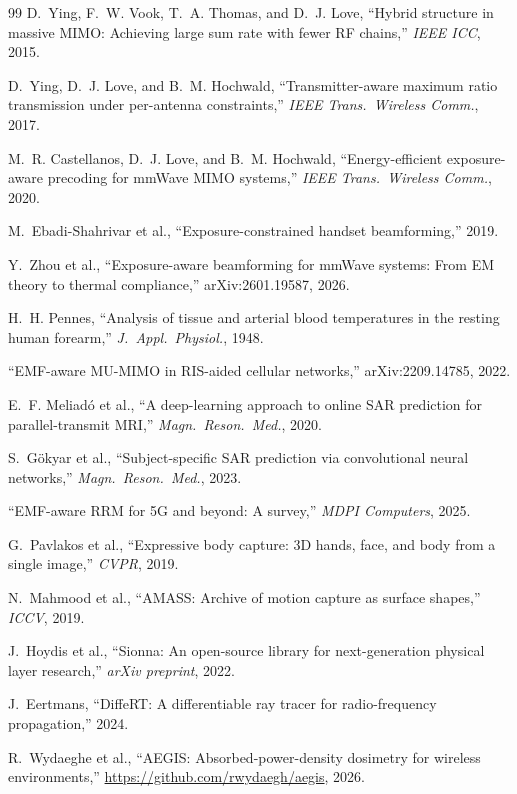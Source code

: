 \documentclass[journal,twoside,onecolumn]{IEEEtran}
\theoremstyle{definition}
\begin{document}
\begin{thebibliography}{99}
D.~Ying, F.~W. Vook, T.~A. Thomas, and D.~J. Love,
``Hybrid structure in massive MIMO: Achieving large sum rate with
fewer RF chains,'' \emph{IEEE ICC}, 2015.

D.~Ying, D.~J. Love, and B.~M. Hochwald, ``Transmitter-aware
maximum ratio transmission under per-antenna constraints,''
\emph{IEEE Trans.\ Wireless Comm.}, 2017.

M.~R. Castellanos, D.~J. Love, and B.~M. Hochwald, ``Energy-efficient exposure-aware precoding for mmWave MIMO systems,''
\emph{IEEE Trans.\ Wireless Comm.}, 2020.

M.~Ebadi-Shahrivar et al., ``Exposure-constrained handset beamforming,'' 2019.

Y.~Zhou et al., ``Exposure-aware beamforming for mmWave systems:
From EM theory to thermal compliance,'' arXiv:2601.19587, 2026.

H.~H. Pennes, ``Analysis of tissue and arterial blood temperatures
in the resting human forearm,'' \emph{J.\ Appl.\ Physiol.}, 1948.

``EMF-aware MU-MIMO in RIS-aided cellular networks,''
arXiv:2209.14785, 2022.

E.~F. Meliad{\'o} et al., ``A deep-learning approach to online SAR
prediction for parallel-transmit MRI,'' \emph{Magn.\ Reson.\ Med.},
2020.

S.~G{\"o}kyar et al., ``Subject-specific SAR prediction via
convolutional neural networks,'' \emph{Magn.\ Reson.\ Med.}, 2023.

``EMF-aware RRM for 5G and beyond: A survey,'' \emph{MDPI
Computers}, 2025.

G.~Pavlakos et al., ``Expressive body capture: 3D hands, face, and
body from a single image,'' \emph{CVPR}, 2019.

N.~Mahmood et al., ``AMASS: Archive of motion capture as surface
shapes,'' \emph{ICCV}, 2019.

J.~Hoydis et al., ``Sionna: An open-source library for
next-generation physical layer research,'' \emph{arXiv
preprint}, 2022.

J.~{Eertmans}, ``DiffeRT: A differentiable ray tracer for
radio-frequency propagation,'' 2024.

R.~Wydaeghe et al., ``AEGIS: Absorbed-power-density dosimetry for
wireless environments,'' \url{https://github.com/rwydaegh/aegis},
2026.


\end{thebibliography}
\end{document}
